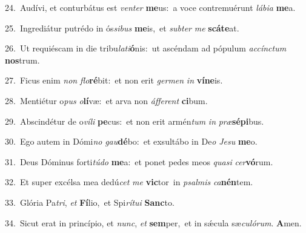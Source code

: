 {\numbfont\textcolor{\numbcolor}{24.}}~Audívi, et conturbátus est \textit{ven}\-\textit{ter} \textbf{me}\-us:~\star a voce contremuérunt \textit{lá}\-\textit{bi}\textit{a} \textbf{me}\-a.\par
{\numbfont\textcolor{\numbcolor}{25.}}~Ingrediátur putrédo in ós\-\textit{si}\-\textit{bus} \textbf{me}\-is,~\star et \textit{sub}\-\textit{ter} \textit{me} \textbf{scá}\-\textbf{te}at.\par
{\numbfont\textcolor{\numbcolor}{26.}}~Ut requiéscam in die tribu\-\textit{la}\-\textit{ti}\textbf{ó}nis:~\star ut ascéndam ad pópulum \textit{ac}\-\textit{cínc}\textit{tum} \textbf{nos}\-trum.\par
{\numbfont\textcolor{\numbcolor}{27.}}~Ficus enim \textit{non} \textit{flo}\-\textbf{ré}bit:~\star et non erit \textit{ger}\-\textit{men} \textit{in} \textbf{ví}\-\textbf{ne}is.\par
{\numbfont\textcolor{\numbcolor}{28.}}~Mentiétur o\textit{pus} \textit{o}\-\textbf{lí}væ:~\star et arva non \textit{áf}\-\textit{fe}\textit{rent} \textbf{ci}\-bum.\par
{\numbfont\textcolor{\numbcolor}{29.}}~Abscindétur de o\-\textit{ví}\-\textit{li} \textbf{pe}\-cus:~\star et non erit armén\textit{tum} \textit{in} \textit{præ}\-\textbf{sé}\textbf{pi}bus.\par
{\numbfont\textcolor{\numbcolor}{30.}}~Ego autem in Dómi\textit{no} \textit{gau}\-\textbf{dé}bo:~\star et exsultábo in De\textit{o} \textit{Je}\-\textit{su} \textbf{me}\-o.\par
{\numbfont\textcolor{\numbcolor}{31.}}~Deus Dóminus forti\-\textit{tú}\-\textit{do} \textbf{me}\-a:~\star et ponet pedes meos \textit{qua}\-\textit{si} \textit{cer}\-\textbf{vó}rum.\par
{\numbfont\textcolor{\numbcolor}{32.}}~Et super excélsa mea dedú\textit{cet} \textit{me} \textbf{vic}\-tor~\star in \textit{psal}\-\textit{mis} \textit{ca}\-\textbf{nén}tem.\par
{\numbfont\textcolor{\numbcolor}{33.}}~Glória Pa\-\textit{tri}\-, \textit{et} \textbf{Fí}\-lio,~\star et Spi\-\textit{rí}\-\textit{tu}\textit{i} \textbf{Sanc}\-to.\par
{\numbfont\textcolor{\numbcolor}{34.}}~Sicut erat in princípio, et \textit{nunc}\-, \textit{et} \textbf{sem}\-per,~\star et in sǽcula sæ\-\textit{cu}\-\textit{ló}\textit{rum}. \textbf{A}\-men.\par
